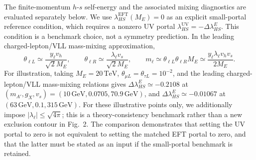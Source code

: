 \documentclass[12pt,a4paper]{article}
\begin{document}
The finite-momentum \(h\)-\(s\) self-energy and the associated mixing diagnostics are evaluated separately below.
We use \(\lambda_{HS}^{\mathrm{EFT}}(M_E)=0\) as an explicit small-portal reference condition, which requires a nonzero UV portal \(\lambda_{HS}^{\mathrm{UV}}=-\Delta\lambda_{HS}^{E}\). This condition is a benchmark choice, not a symmetry prediction. In the leading charged-lepton/VLL mass-mixing approximation,
\[
\theta_{\ell L}\simeq\frac{y_\ell v_h}{\sqrt2M_E},
\qquad
\theta_{\ell R}\simeq\frac{\lambda_\ell v_s}{\sqrt2M_E},
\qquad
m_\ell\simeq\theta_{\ell L}\theta_{\ell R}M_E
\simeq\frac{y_\ell\lambda_\ell v_hv_s}{2M_E}.
\]
For illustration, taking \(M_E=20\,\mathrm{TeV}\), \(\theta_{\mu L}=\theta_{\tau L}=10^{-2}\), and the leading charged-lepton/VLL mass-mixing relations gives \(\Delta\lambda_{HS}^{E}\simeq-0.2108\) at \((m_{A'},g_X,v_s)=(10\,\mathrm{GeV},0.0705,70.9\,\mathrm{GeV})\), and \(\Delta\lambda_{HS}^{E}\simeq-0.01067\) at \((63\,\mathrm{GeV},0.1,315\,\mathrm{GeV})\). For these illustrative points only, we additionally impose \(|\lambda_\ell|\leq\sqrt{4\pi}\); this is a theory-consistency benchmark rather than a new exclusion contour in Fig.~2. The comparison demonstrates that setting the UV portal to zero is not equivalent to setting the matched EFT portal to zero, and that the latter must be stated as an input if the small-portal benchmark is retained.
\end{document}
